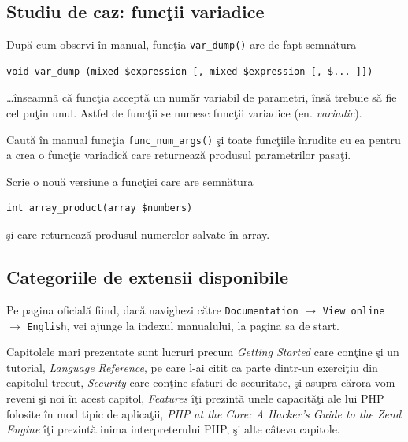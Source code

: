 
\subsection{Studiu de caz: funcţii variadice}
După cum observi în manual, funcţia \texttt{var\_dump()}
are de fapt semnătura
\begin{verbatim}
void var_dump (mixed $expression [, mixed $expression [, $... ]])
\end{verbatim}
\ldots înseamnă că funcţia acceptă un număr variabil
de parametri, însă trebuie să fie cel puţin unul.
Astfel de funcţii se numesc funcţii variadice (en. \textsl{variadic}).

\begin{Exercise}[title={Crează o funcţie variadică}]
\ExePart
Caută în manual funcţia \texttt{func\_num\_args()} şi
toate funcţiile înrudite cu ea pentru a crea
o funcţie variadică care returnează produsul parametrilor
pasaţi.

\ExePart
Scrie o nouă versiune a funcţiei care are semnătura
\begin{verbatim}
int array_product(array $numbers)
\end{verbatim}
şi care returnează produsul numerelor salvate în array.

% 
\end{Exercise}


\subsection{Categoriile de extensii disponibile}
Pe pagina oficială fiind, dacă navighezi către
\texttt{Documentation} $\rightarrow$ \texttt{View online}
$\rightarrow$ \texttt{English},
vei ajunge la indexul
manualului, la pagina sa de start.

Capitolele mari prezentate sunt lucruri precum
\textit{Getting Started} care conţine şi un tutorial,
\textit{Language Reference}, pe care l-ai
citit ca parte dintr-un exerciţiu din capitolul trecut,
\textit{Security} care conţine sfaturi de securitate,
şi asupra cărora vom reveni şi noi
în acest capitol, \textit{Features} îţi prezintă
unele capacităţi ale lui PHP folosite
în mod tipic de aplicaţii, \textit{PHP at the Core: A Hacker's Guide to the Zend Engine}
îţi prezintă inima interpreterului PHP, şi alte câteva capitole.

